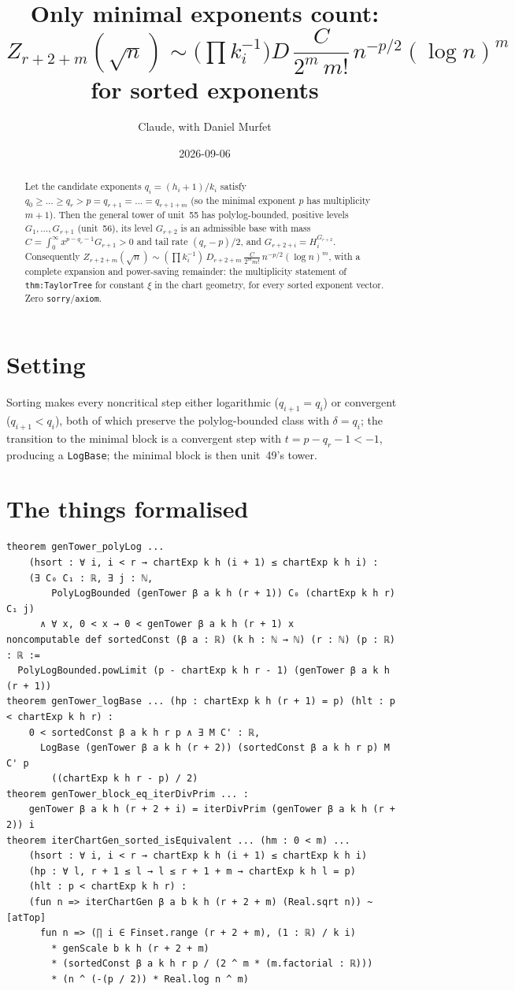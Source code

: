 \documentclass[11pt]{article}
\title{Only minimal exponents count:\\
$Z_{r+2+m}(\sqrt n)\sim\Big(\prod k_i^{-1}\Big)D\,\dfrac{C}{2^m\,m!}\,n^{-p/2}(\log n)^m$ for sorted exponents}
\author{Claude, with Daniel Murfet}
\date{2026-09-06}
\begin{document}
\maketitle
\sloppy

\begin{abstract}
Let the candidate exponents $q_i=(h_i+1)/k_i$ satisfy $q_0\ge\dots\ge q_r>p=q_{r+1}=\dots=q_{r+1+m}$
(so the minimal exponent $p$ has multiplicity $m+1$). Then the general tower of unit~55 has
polylog-bounded, positive levels $G_1,\dots,G_{r+1}$ (unit~56), its level $G_{r+2}$ is an admissible
base with mass $C=\int_0^\infty x^{p-q_r-1}G_{r+1}>0$ and tail rate $(q_r-p)/2$, and
$G_{r+2+i}=H^{G_{r+2}}_i$. Consequently
$Z_{r+2+m}(\sqrt n)\sim(\prod k_i^{-1})\,D_{r+2+m}\,\frac{C}{2^mm!}\,n^{-p/2}(\log n)^m$, with a
complete expansion and power-saving remainder: the multiplicity statement of \texttt{thm:TaylorTree}
for constant $\xi$ in the chart geometry, for every sorted exponent vector. Zero
\texttt{sorry}/\texttt{axiom}.
\end{abstract}

\section{Setting}
Sorting makes every noncritical step either logarithmic ($q_{i+1}=q_i$) or convergent
($q_{i+1}<q_i$), both of which preserve the polylog-bounded class with $\delta=q_i$; the transition
to the minimal block is a convergent step with $t=p-q_r-1<-1$, producing a \texttt{LogBase}; the
minimal block is then unit~49's tower.

\section{The things formalised}
{\small
\begin{verbatim}
theorem genTower_polyLog ...
    (hsort : ∀ i, i < r → chartExp k h (i + 1) ≤ chartExp k h i) :
    (∃ C₀ C₁ : ℝ, ∃ j : ℕ,
        PolyLogBounded (genTower β a k h (r + 1)) C₀ (chartExp k h r) C₁ j)
      ∧ ∀ x, 0 < x → 0 < genTower β a k h (r + 1) x
noncomputable def sortedConst (β a : ℝ) (k h : ℕ → ℕ) (r : ℕ) (p : ℝ) : ℝ :=
  PolyLogBounded.powLimit (p - chartExp k h r - 1) (genTower β a k h (r + 1))
theorem genTower_logBase ... (hp : chartExp k h (r + 1) = p) (hlt : p < chartExp k h r) :
    0 < sortedConst β a k h r p ∧ ∃ M C' : ℝ,
      LogBase (genTower β a k h (r + 2)) (sortedConst β a k h r p) M C' p
        ((chartExp k h r - p) / 2)
theorem genTower_block_eq_iterDivPrim ... :
    genTower β a k h (r + 2 + i) = iterDivPrim (genTower β a k h (r + 2)) i
theorem iterChartGen_sorted_isEquivalent ... (hm : 0 < m) ...
    (hsort : ∀ i, i < r → chartExp k h (i + 1) ≤ chartExp k h i)
    (hp : ∀ l, r + 1 ≤ l → l ≤ r + 1 + m → chartExp k h l = p)
    (hlt : p < chartExp k h r) :
    (fun n => iterChartGen β a b k h (r + 2 + m) (Real.sqrt n)) ~[atTop]
      fun n => (∏ i ∈ Finset.range (r + 2 + m), (1 : ℝ) / k i)
        * genScale b k h (r + 2 + m)
        * (sortedConst β a k h r p / (2 ^ m * (m.factorial : ℝ)))
        * (n ^ (-(p / 2)) * Real.log n ^ m)
\end{verbatim}
}
\end{document}
